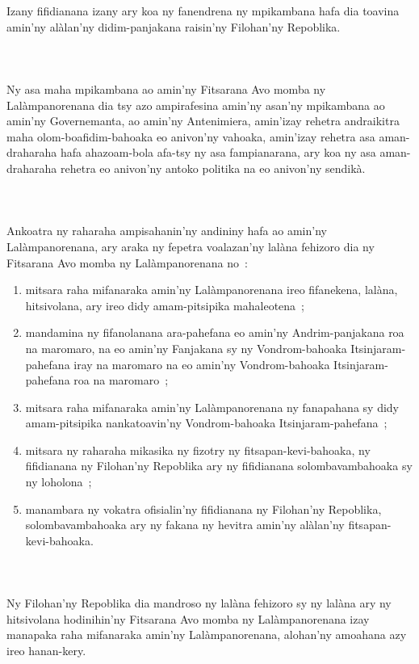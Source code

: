 \documentclass[12pt]{article}
\newcounter{laharana}
\newcommand{\andininy}[0]{
  \paragraph{%
    \NoCaseChange{%
      Andininy~\addtocounter{laharana}{1}\thelaharana.}\label{and:\thelaharana}~%
  }%
}
\begin{document}
\noindent
Izany fifidianana izany ary koa ny fanendrena ny mpikambana hafa dia toavina
amin'ny alàlan'ny didim-panjakana raisin'ny Filohan'ny Repoblika.

\andininy{}Ny asa maha mpikambana ao amin'ny Fitsarana Avo momba ny
Lalàmpanorenana dia tsy azo ampirafesina amin'ny asan'ny mpikambana ao amin'ny
Governemanta, ao amin'ny Antenimiera, amin'izay rehetra andraikitra maha
olom-boafidim-bahoaka eo anivon'ny vahoaka, amin'izay rehetra asa aman-draharaha
hafa ahazoam-bola afa-tsy ny asa fampianarana, ary koa ny asa aman-draharaha
rehetra eo anivon'ny antoko politika na eo anivon'ny sendikà.\\

\noindent
\andininy{}Ankoatra ny raharaha ampisahanin'ny andininy hafa ao amin'ny
Lalàmpanorenana, ary araka ny fepetra voalazan'ny lalàna fehizoro dia ny
Fitsarana Avo momba ny Lalàmpanorenana no~:

\begin{enumerate}
\item mitsara raha mifanaraka amin'ny Lalàmpanorenana ireo fifanekena, lalàna,
  hitsivolana, ary ireo didy amam-pitsipika mahaleotena~;

\item mandamina ny fifanolanana ara-pahefana eo amin'ny Andrim-panjakana roa na
  maromaro, na eo amin'ny Fanjakana sy ny Vondrom-bahoaka Itsinjaram-pahefana
  iray na maromaro na eo amin'ny Vondrom-bahoaka Itsinjaram-pahefana roa na
  maromaro~;

\item mitsara raha mifanaraka amin'ny Lalàmpanorenana ny fanapahana sy didy
  amam-pitsipika nankatoavin'ny Vondrom-bahoaka Itsinjaram-pahefana~;

\item mitsara ny raharaha mikasika ny fizotry ny fitsapan-kevi-bahoaka, ny
  fifidianana ny Filohan'ny Repoblika ary ny fifidianana solombavambahoaka sy ny
  loholona~;

\item manambara ny vokatra ofisialin'ny fifidianana ny Filohan'ny Repoblika,
  solombavambahoaka ary ny fakana ny hevitra amin'ny alàlan'ny
  fitsapan-kevi-bahoaka.
\end{enumerate}

\andininy{}Ny Filohan'ny Repoblika dia mandroso ny lalàna fehizoro sy ny lalàna
ary ny hitsivolana hodinihin'ny Fitsarana Avo momba ny Lalàmpanorenana izay
manapaka raha mifanaraka amin'ny Lalàmpanorenana, alohan'ny amoahana azy ireo
hanan-kery.\\
\end{document}
